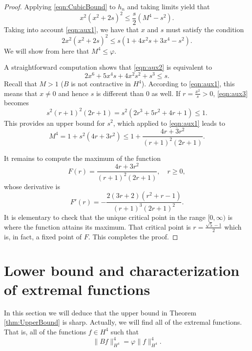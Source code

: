 \documentclass{amsart}
\theoremstyle{plain}
\theoremstyle{definition}
\begin{document}
\begin{proof}
            Applying \eqref{eqn:CubicBound} to $h_n$ and taking limits yield that
            \[
            x^2(x^2+2s)^2 \leq \dfrac{s}{2} (M^4 - s^2).
            \]
            Taking into account \eqref{eqn:aux1}, we have that $x$ and $s$ must satisfy the condition
            \begin{equation} \label{eqn:aux2}
                2x^2 (x^2 + 2s)^2 \leq s (1 + 4x^2s + 3x^4 - s^2).
            \end{equation}
            We will show from here that $M^4 \leq \varphi$.
            
            A straightforward computation shows that \eqref{eqn:aux2} is equivalent to
            \begin{equation} \label{eqn:aux3}
                2x^6 + 5x^4s+4x^2s^2+s^3 \leq s.
            \end{equation}
            Recall that $M > 1$ ($B$ is not contractive in $H^4$). According to \eqref{eqn:aux1}, this means that $x \neq 0$ and hence $s$ is different than $0$ as well. If $r = \frac{x^2}{s} > 0$, \eqref{eqn:aux3} becomes
            \[
            s^2 (r + 1)^2 (2r + 1) = s^2 (2r^3 + 5r^2 + 4r + 1) \leq 1.
            \]
            This provides an upper bound for $s^2$, which applied to \eqref{eqn:aux1} leads to
            \[
            M^4 = 1 + s^2 (4r+3r^2) \leq 1 + \dfrac{4r + 3r^2}{(r+1)^2 (2r+1)}.
            \]
            
            It remains to compute the maximum of the function
            \begin{equation} \label{eqn:AuxFunct}
                F(r)=\frac{4r+3r^2}{(r+1)^2(2r+1)}, \quad r \geq 0,
            \end{equation}
            whose derivative is
            \[
                F'(r) = -\dfrac{2(3r+2)(r^2+r-1)}{(r+1)^3(2r+1)^2}.
            \]
            It is elementary to check that the unique critical point in the range $[0, \infty)$ is where the function attains its maximum. That critical point is $r = \frac{\sqrt{5}-1}{2}$ which is, in fact, a fixed point of $F$. This completes the proof.
        \end{proof}
	
	\section{Lower bound and characterization of extremal functions} \label{sec:NormAttaining}
	
    	In this section we will deduce that the upper bound in Theorem \ref{thm:UpperBound} is sharp. Actually, we will find all of the extremal functions. That is, all of the functions $f \in H^4$ such that
    	\[
    	   \| B f \|_{H^4}^4 = \varphi \| f \|_{H^4}^4.
    	\]
    	
\end{document}
